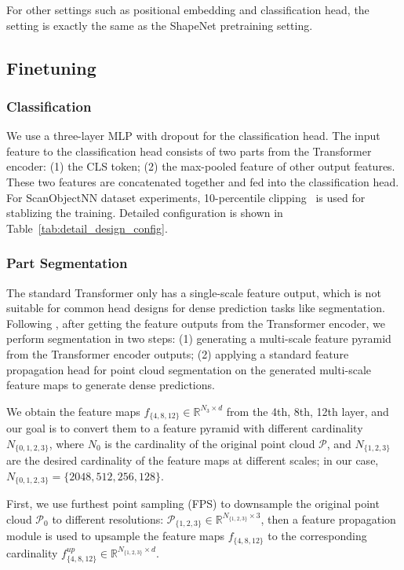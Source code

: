 \documentclass[runningheads]{llncs}
\begin{document}
For other settings such as positional embedding and classification head, the setting is exactly the same as the ShapeNet pretraining setting. 
    
\subsection{Finetuning}

\subsubsection{Classification}
We use a three-layer MLP with dropout for the classification head. The input feature to the classification head consists of two parts from the Transformer encoder: (1) the CLS token; (2) the max-pooled feature of other output features. These two features are concatenated together and fed into the classification head. For ScanObjectNN dataset experiments, 10-percentile clipping~\cite{seetharaman2020autoclip} is used for stablizing the training.  Detailed configuration is shown in Table~\ref{tab:detail_design_config}.

\vspace{-10pt}
\subsubsection{Part Segmentation}
The standard Transformer only has a single-scale feature output, which is not suitable for common head designs for dense prediction tasks like segmentation.  Following \cite{yu2021point}, after getting the feature outputs from the Transformer encoder, we perform segmentation in two steps: (1) generating a multi-scale feature pyramid from the Transformer encoder outputs; (2) applying a standard feature propagation head for point cloud segmentation on the generated multi-scale feature maps to generate dense predictions.

We obtain the feature maps $f_{\{4,8,12\}} \in \mathbb{R}^{N_3 \times d}$ from the 4th, 8th, 12th layer, and our goal is to convert them to a feature pyramid with different cardinality $N_{\{0,1,2,3\}}$, where $N_0$ is the cardinality of the original point cloud $\mathcal{P}$, and $N_{\{1,2,3\}}$ are the desired cardinality of the feature maps at different scales; in our case, $N_{\{0,1,2,3\}} = \{2048, 512, 256, 128\}$.

First, we use furthest point sampling (FPS) to downsample the original point cloud $\mathcal{P}_0$ to different resolutions: $\mathcal{P}_{\{1,2,3\}} \in \mathbb{R}^{N_{\{1,2,3\}} \times 3}$, then a feature propagation module is used to upsample the feature maps $f_{\{4,8,12\}}$ to the corresponding cardinality  $f^{up}_{\{4,8,12\}} \in \mathbb{R}^{N_{\{1,2,3\}} \times d}$.
\end{document}
